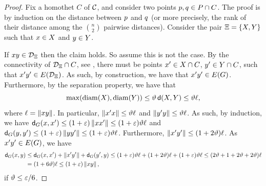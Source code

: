 \documentclass[12pt]{article}%
\begin{document}
\begin{proof}
    Fix a homothet $C$ of $\mathcal{C}$, and consider two points
    $p, q \in P \cap C$.  The proof is by induction on the
    distance between $p$ and $q$ (or more precisely, the rank of
    their distance among the $\binom{n}{2}$ pairwise distances).
    Consider the pair $\Xi = \{ X, Y \}$ such that
    $x \in X$ and $y \in Y$.

    
    If $x y \in \mathcal{D}_\Xi$ then the claim holds. So assume this is
    not the case. By the connectivity of $\mathcal{D}_\Xi \cap C$, see
    , there must be points
    $x' \in X \cap C$, $y' \in Y \cap C$, such that
    $\px'\py' \in \EGX{ \DT_\Pair}$. As such, by construction, we have
    that $\px'\py' \in \EGX{\G}$. Furthermore, by the separation
    property, we have that
    \begin{equation*}
        \max \pth{ \diameterX{\PSX}, \diameterX{\PSY} }%
        \leq%
        \epsA \, \dsY{\PSX}{\PSY}%
        \leq%
        \epsA \ell,
    \end{equation*}
    where $\ell = \left\| x y \right\|$. In particular,
    $\left\| x' x \right\| \leq \vartheta \ell$ and
    $\left\| y' y \right\| \leq \vartheta \ell$. As such, by induction, we have
    $\dGZ{\G}{\px}{\px'} \leq (1+\eps)\dY{\px}{\px'} \leq
    (1+\eps)\epsA \ell$ and
    $\dGZ{\G}{\py}{\py'} \leq (1+\eps)\dY{\py}{\py'} \leq
    (1+\eps)\epsA \ell$.  Furthermore,
    $\left\| x' y' \right\| \leq (1+2\vartheta)\ell$. As $\px'\py' \in \EGX{\G}$,
    we have
    \begin{align*}
      \dGZ{\G}{\px}{\py}%
      &\leq%
        \dGZ{\G}{\px}{\px'}%
        +\dY{\px'}{\py'}
        +
        \dGZ{\G}{\py'}{\py}%
        \leq%
        (1+\eps)\epsA \ell
        +(1+2\epsA)\ell
        + (1+\eps)\epsA \ell
        \leq%
        \pth{ 2\epsA +1+2\epsA + 2\epsA } \ell
      \\&%
      =%
      \pth{ 1+ 6\epsA  } \ell
      \leq%
      \pth{ 1+ \eps  } \dY{\px}{\py},
    \end{align*}
    if $\vartheta \leq \varepsilon/6$.
\end{proof}
\end{document}
